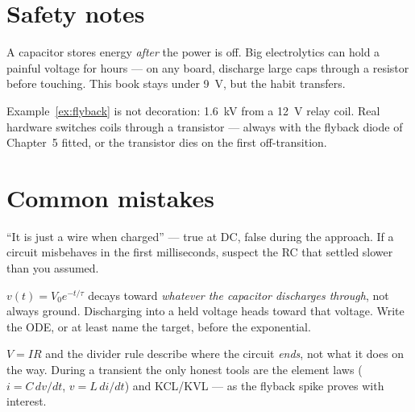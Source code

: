 \section{Safety notes}
\label{sec:safety4}

\begin{rulebox}
A capacitor stores energy \emph{after} the power is off. Big electrolytics
can hold a painful voltage for hours — on any board, discharge large caps
through a resistor before touching. This book stays under \qty{9}{\volt}, but
the habit transfers.
\end{rulebox}

\begin{rulebox}
Example~\ref{ex:flyback} is not decoration: \qty{1.6}{\kilo\volt} from a
\qty{12}{\volt} relay coil. Real hardware switches coils through a
transistor — always with the flyback diode of Chapter~5 fitted, or the
transistor dies on the first off-transition.
\end{rulebox}

\section{Common mistakes}
\label{sec:mistakes4}

\begin{tripwire}
``It is just a wire when charged'' — true at DC, false during the approach.
If a circuit misbehaves in the first milliseconds, suspect the RC that
settled slower than you assumed.
\end{tripwire}

\begin{tripwire}
$v(t)=V_0 e^{-t/\tau}$ decays toward \emph{whatever the capacitor discharges
through}, not always ground. Discharging into a held voltage heads toward
that voltage. Write the ODE, or at least name the target, before the
exponential.
\end{tripwire}

\begin{tripwire}
$V=IR$ and the divider rule describe where the circuit \emph{ends}, not what
it does on the way. During a transient the only honest tools are the element
laws ($i=C\,dv/dt$, $v=L\,di/dt$) and KCL/KVL — as the flyback spike proves
with interest.
\end{tripwire}

